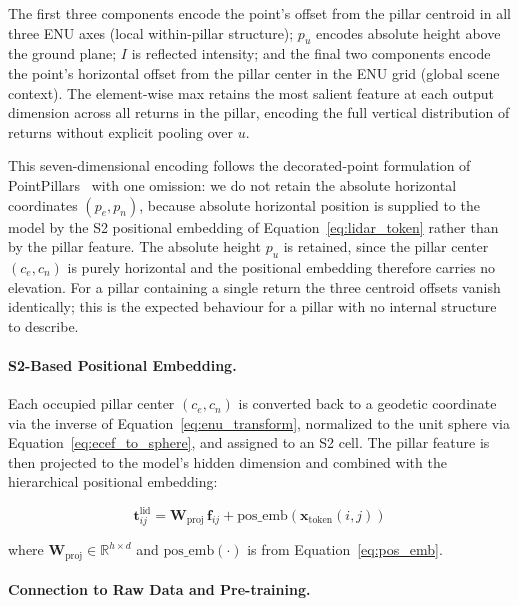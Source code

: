 \documentclass{book}
\begin{document}
The first three components encode the point's offset from the pillar
centroid in all three ENU axes (local within-pillar structure);
$p_u$ encodes absolute height above the ground plane; $I$ is
reflected intensity; and the final two components encode the point's
horizontal offset from the pillar center in the ENU grid (global
scene context).  The element-wise max retains the most salient
feature at each output dimension across all returns in the pillar,
encoding the full vertical distribution of returns without explicit
pooling over $u$.

This seven-dimensional encoding follows the decorated-point
formulation of PointPillars~\cite{lang2019pointpillars} with one
omission: we do not retain the absolute horizontal coordinates
$(p_e, p_n)$, because absolute horizontal position is supplied to the
model by the S2 positional embedding of
Equation~\eqref{eq:lidar_token} rather than by the pillar feature.
The absolute height $p_u$ is retained, since the pillar center
$(c_e, c_n)$ is purely horizontal and the positional embedding
therefore carries no elevation.  For a pillar containing a single
return the three centroid offsets vanish identically; this is the
expected behaviour for a pillar with no internal structure to
describe.

\paragraph{S2-Based Positional Embedding.}

Each occupied pillar center $(c_e, c_n)$ is converted back to a
geodetic coordinate via the inverse of
Equation~\eqref{eq:enu_transform}, normalized to the unit sphere via
Equation~\eqref{eq:ecef_to_sphere}, and assigned to an S2 cell.  The
pillar feature is then projected to the model's hidden dimension and
combined with the hierarchical positional embedding:

\begin{equation}
  \mathbf{t}^{\text{lid}}_{ij} =
    \mathbf{W}_{\text{proj}}\,\mathbf{f}_{ij}
    + \text{pos\_emb}\!\left(\mathbf{x}_{\text{token}}(i,j)\right)
  \label{eq:lidar_token}
\end{equation}

where $\mathbf{W}_{\text{proj}} \in \mathbb{R}^{h \times d}$ and
$\text{pos\_emb}(\cdot)$ is from Equation~\eqref{eq:pos_emb}.

\paragraph{Connection to Raw Data and Pre-training.}
\end{document}
